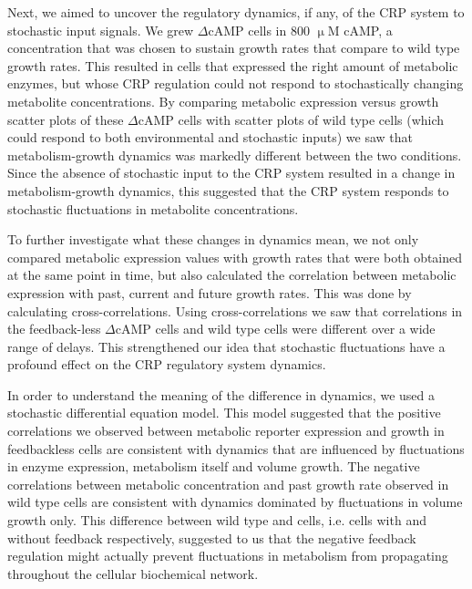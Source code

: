 Next, we aimed to 
uncover
the regulatory dynamics, if any, of the CRP system to stochastic input signals.
%
We grew  $\Delta$cAMP cells in 800 $\upmu$M cAMP,
a concentration that was chosen to sustain growth rates that compare to wild type growth rates.
%
This resulted in cells that expressed the right amount of metabolic enzymes, 
but whose CRP regulation could not respond to stochastically changing metabolite concentrations.
%
By comparing metabolic expression versus growth scatter plots of these $\Delta$cAMP cells with
scatter plots of wild type cells (which could respond to both environmental and stochastic inputs)  
we saw that metabolism-growth dynamics was markedly different between the two conditions.
%
Since the absence 
of stochastic input to the CRP system resulted in a change in metabolism-growth dynamics, 
this suggested that the CRP system responds to stochastic fluctuations in metabolite concentrations.

To further investigate what these changes in dynamics mean, 
we not only compared metabolic expression values with growth rates that were both obtained at the same point in time,
but also calculated the correlation between metabolic expression with past, current and future growth rates.
%
This was done by calculating cross-correlations.
%
Using cross-correlations we saw that correlations in the feedback-less $\Delta$cAMP cells and wild type cells were different over a wide range of delays.
%
This strengthened our idea that stochastic fluctuations have a profound effect on the CRP regulatory system dynamics.

In order to understand the meaning of the difference in dynamics, we used a stochastic differential equation model.
%
This model suggested that the positive correlations we observed between metabolic reporter expression and growth in feedbackless \dcamp cells 
are consistent with dynamics that are influenced by fluctuations in enzyme expression, metabolism itself and volume growth.
% 
The negative correlations between metabolic concentration and past growth rate observed in wild type cells are consistent 
with dynamics dominated by fluctuations in volume growth only. 
%
This difference between wild type and \dcamp cells, i.e. cells with and without feedback respectively, suggested to us
that the negative feedback regulation might actually 
prevent fluctuations in metabolism from propagating throughout the cellular biochemical network.

